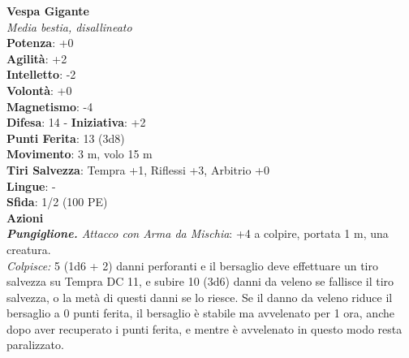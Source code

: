 \begin{multicols}{2}
\medskip\textbf{Vespa Gigante}\\
\emph{Media bestia, disallineato}\\
\textbf{Potenza}: +0\\
\textbf{Agilità}: +2\\
\textbf{Intelletto}: -2\\
\textbf{Volontà}: +0\\
\textbf{Magnetismo}: -4\\
\textbf{Difesa}: 14 - \textbf{Iniziativa}: +2\\
\textbf{Punti Ferita}: 13 (3d8)\\
\textbf{Movimento}: 3 m, volo 15 m\\
\textbf{Tiri Salvezza}: Tempra +1, Riflessi +3, Arbitrio +0 \\
\textbf{Lingue}: -\\
\textbf{Sfida}: 1/2 (100 PE)\smallskip\\
\smallskip\textbf{Azioni}\\
\emph{\textbf{Pungiglione.} Attacco con Arma da Mischia}: +4 a colpire, portata 1 m, una creatura.\\
\emph{Colpisce:} 5 (1d6 + 2) danni perforanti e il bersaglio deve effettuare un tiro salvezza su Tempra DC 11, e subire 10 (3d6) danni da veleno se fallisce il tiro salvezza, o la metà di questi danni se lo riesce. Se il danno da veleno riduce il bersaglio a 0 punti ferita, il bersaglio è stabile ma avvelenato per 1 ora, anche dopo aver recuperato i punti ferita, e mentre è avvelenato in questo modo resta paralizzato.\\


\end{multicols}
